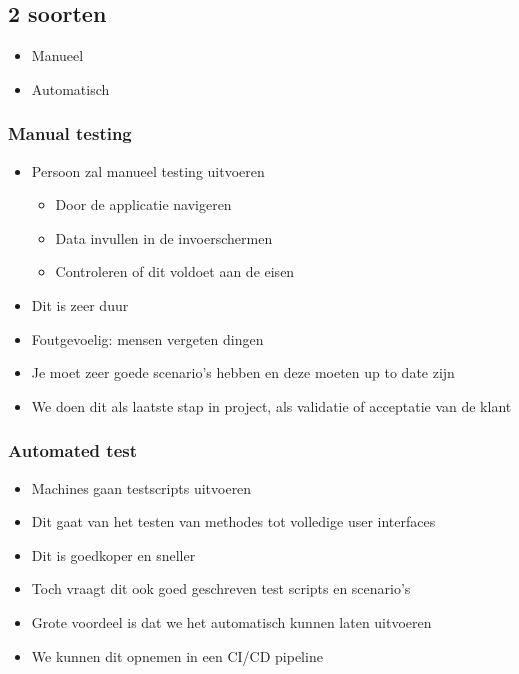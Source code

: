 \documentclass{article}
\begin{document}
\subsection{2 soorten}

\begin{itemize}
    \item Manueel
    \item Automatisch
\end{itemize}

\subsubsection{Manual testing}

\begin{itemize}
    \item Persoon zal manueel testing uitvoeren
    \begin{itemize}
        \item Door de applicatie navigeren
        \item Data invullen in de invoerschermen
        \item Controleren of dit voldoet aan de eisen
    \end{itemize}
    \item Dit is zeer duur
    \item Foutgevoelig: mensen vergeten dingen
    \item Je moet zeer goede scenario's hebben en deze moeten up to date zijn
    \item We doen dit als laatste stap in project, als validatie of acceptatie van de klant
\end{itemize}

\subsubsection{Automated test}

\begin{itemize}
    \item Machines gaan testscripts uitvoeren
    \item Dit gaat van het testen van methodes tot volledige user interfaces
    \item Dit is goedkoper en sneller
    \item Toch vraagt dit ook goed geschreven test scripts en scenario’s
    \item Grote voordeel is dat we het automatisch kunnen laten uitvoeren
    \item We kunnen dit opnemen in een CI/CD pipeline
\end{itemize}
\end{document}
